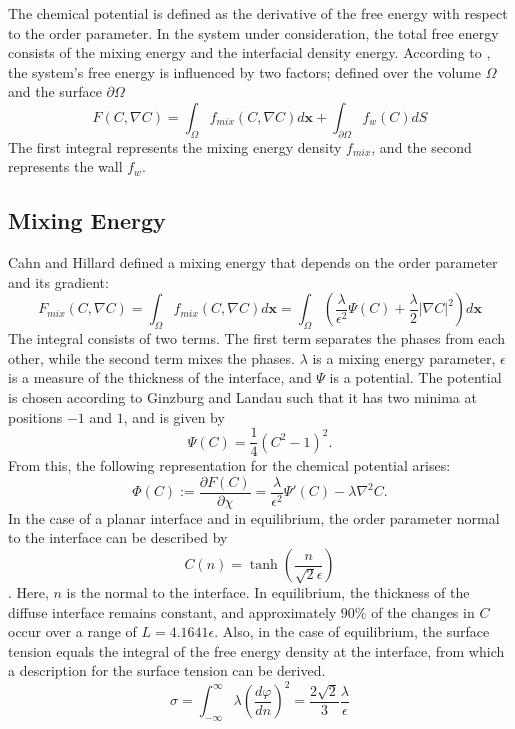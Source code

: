 The chemical potential is defined as the derivative of the free energy with respect to the order parameter. In the system under consideration, the total free energy consists of the mixing energy and the interfacial density energy. According to \cite{yue2010SharpinterfaceLimitCahn}, the system's free energy is influenced by two factors; defined over the volume $\Omega$ and the surface $\partial\Omega$ 
\begin{equation}
    F(C, \nabla C) = \int_{\Omega} f_{mix} (C, \nabla C) d\textbf{x}+ \int_{\partial\Omega}f_w(C) dS
\end{equation}
The first integral represents the mixing energy density $f_{mix}$, and the second represents the wall $f_w$.
\subsection{Mixing Energy}
Cahn and Hillard defined a mixing energy that depends on the order parameter and its gradient:
\begin{equation}
    F_{mix}(C, \nabla C) = \int_{\Omega} f_{mix} (C, \nabla C) d\textbf{x} = \int_{\Omega}\left(\frac{\lambda}{\epsilon^2}\Psi(C)+\frac{\lambda}{2}\vert\nabla C\vert^2\right)d\textbf{x}
\end{equation}
The integral consists of two terms. The first term separates the phases from each other, while the second term mixes the phases. $\lambda$ is a mixing energy parameter, $\epsilon$ is a measure of the thickness of the interface, and $\Psi$ is a potential. The potential is chosen according to Ginzburg and Landau such that it has two minima at positions $-1$ and $1$, and is given by
\begin{equation}
    \Psi(C)= \frac{1}{4}\left(C^2-1\right)^2.
\end{equation}
From this, the following representation for the chemical potential arises:
\begin{equation}
    \label{eq: chempotentialMIXING_pahseFieldMethod}
     \Phi(C):= \frac{\partial F(C)}{\partial \chi} = \frac{\lambda}{\epsilon^2}\Psi'(C)-\lambda\nabla^2C.
\end{equation}
In the case of a planar interface and in equilibrium, the order parameter normal to the interface can be described by
\begin{equation}
    C(n) = \tanh\left(\frac{n}{\sqrt{2}\epsilon}\right)
\end{equation}\cite{cai2015NumericalSimulationWetting}. Here, $n$ is the normal to the interface. In equilibrium, the thickness of the diffuse interface remains constant, and approximately $90\%$ of the changes in $C$ occur over a range of $L=4.1641\epsilon$. Also, in the case of equilibrium, the surface tension equals the integral of the free energy density at the interface, from which a description for the surface tension can be derived. 
\begin{equation}
\label{eq: surfacetensionEqui}
    \sigma = \int_{-\infty}^{\infty}\lambda\left( \frac{d\varphi}{dn}  \right)^{2}= \frac{2\sqrt{2}}{3} \frac{\lambda}{\epsilon}
\end{equation}
